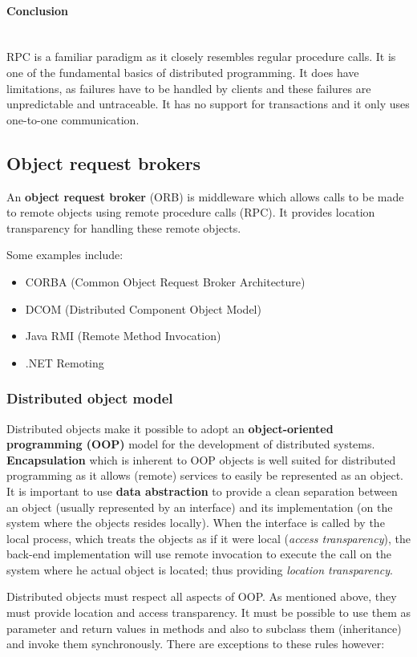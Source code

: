 \documentclass[a4paper]{article}
\newcommand{\subsubsubsection}[1]{\paragraph{#1}\mbox{}\\}
\begin{document}
\subsubsubsection{Conclusion}

RPC is a familiar paradigm as it closely resembles regular procedure calls. It is one of the fundamental basics of distributed programming. It does have limitations, as failures have to be handled by clients and these failures are unpredictable and untraceable. It has no support for transactions and it only uses one-to-one communication.

\subsection{Object request brokers}

An \textbf{object request broker} (ORB) is middleware which allows calls to be made to remote objects using remote procedure calls (RPC). It provides location transparency for handling these remote objects.

Some examples include:
\begin{itemize}
\item CORBA (Common Object Request Broker Architecture)
\item DCOM (Distributed Component Object Model)
\item Java RMI (Remote Method Invocation)
\item .NET Remoting
\end{itemize}

\subsubsection{Distributed object model}

Distributed objects make it possible to adopt an \textbf{object-oriented programming (OOP)} model for the development of distributed systems. \textbf{Encapsulation} which is inherent to OOP objects is well suited for distributed programming as it allows (remote) services to easily be represented as an object. It is important to use \textbf{data abstraction} to provide a clean separation between an object (usually represented by an interface) and its implementation (on the system where the objects resides locally). When the interface is called by the local process, which treats the objects as if it were local (\textit{access transparency}), the back-end implementation will use remote invocation to execute the call on the system where he actual object is located; thus providing \textit{location transparency}.

Distributed objects must respect all aspects of OOP. As mentioned above, they must provide location and access transparency. It must be possible to use them as parameter and return values in methods and also to subclass them (inheritance) and invoke them synchronously. There are exceptions to these rules however:
\end{document}

